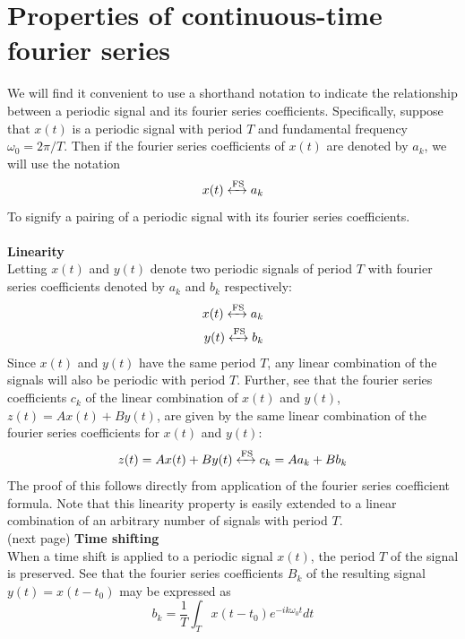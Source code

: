 \documentclass{report}
\begin{document}
\section{Properties of continuous-time fourier series}
We will find it convenient to use a shorthand notation to indicate the relationship between a periodic signal and its fourier series coefficients. Specifically,
suppose that $x(t)$ is a periodic signal with period $T$ and fundamental frequency $\omega_0=2\pi/T$. Then if the fourier series coefficients of $x(t)$ are denoted by $a_k$, we will use the notation
\begin{equation*}
x(t)\xleftrightarrow[]{\text{FS}}a_k
\end{equation*}
To signify a pairing of a periodic signal with its fourier series coefficients.\\
\vspace{1mm}\\
\noindent\textbf{Linearity}\\
Letting $x(t)$ and $y(t)$ denote two periodic signals of period $T$ with fourier series coefficients denoted by $a_k$ and $b_k$ respectively:
\begin{align*}
x(t)\xleftrightarrow[]{\text{FS}}a_k\\
y(t)\xleftrightarrow[]{\text{FS}}b_k
\end{align*}
Since $x(t)$ and $y(t)$ have the same period $T$, any linear combination of the signals will also be periodic with period $T$. Further, see that the fourier series coefficients $c_k$ of the linear
combination of $x(t)$ and $y(t)$, $z(t)=Ax(t)+By(t)$, are given by the same linear combination 
of the fourier series coefficients for $x(t)$ and $y(t)$:
\begin{equation*}
z(t)=Ax(t)+By(t)\xleftrightarrow[]{\text{FS}}c_k=Aa_k+Bb_k
\end{equation*}
The proof of this follows directly from application of the fourier series coefficient formula. Note that this linearity property is easily extended to a linear combination of an arbitrary number
of signals with period $T$.\\
(next page)\newpage
\noindent\textbf{Time shifting}\\
When a time shift is applied to a periodic signal $x(t)$, the period $T$ of the signal is preserved. See that the fourier series coefficients $B_k$ of the resulting signal $y(t)=x(t-t_0)$ may be 
expressed as
\begin{equation*}
b_k=\frac{1}{T}\int_Tx(t-t_0)e^{-ik\omega_0t}dt
\end{equation*}
\end{document}
